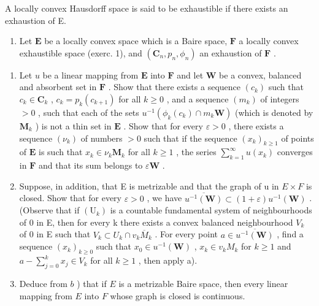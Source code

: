 A locally convex Hausdorff space is said to be exhaustible if there exists an exhaustion of E.

\begin{enumerate}
\def\labelenumi{\arabic{enumi})}
\setcounter{enumi}{1}
\tightlist
\item
  Let \(\mathbf{E}\) be a locally convex space which is a Baire space, \(\mathbf{F}\) a locally convex exhaustible space (exerc. 1), and \((\mathbf{C}_n, p_n, \phi_n)\) an exhaustion of \(\mathbf{F}\) .
\end{enumerate}

\begin{enumerate}
\def\labelenumi{\alph{enumi})}
\item
  Let \(u\) be a linear mapping from \(\mathbf{E}\) into \(\mathbf{F}\) and let \(\mathbf{W}\) be a convex, balanced and absorbent set in \(\mathbf{F}\) . Show that there exists a sequence \((c_k)\) such that \(c_k \in \mathbf{C}_k\) , \(c_k = p_k(c_{k+1})\) for all \(k \geqslant 0\) , and a sequence \((m_k)\) of integers \(> 0\) , such that each of the sets \(u^{-1}(\phi_k(c_k) \cap m_k\mathbf{W})\) (which is denoted by \(\mathbf{M}_k\) ) is not a thin set in \(\mathbf{E}\) . Show that for every \(\varepsilon > 0\) , there exists a sequence \((\nu_k)\) of numbers \(> 0\) such that if the sequence \((x_k)_{k \geqslant 1}\) of points of \(\mathbf{E}\) is such that \(x_k \in \nu_k\mathbf{M}_k\) for all \(k \geqslant 1\) , the series \(\sum_{k=1}^{\infty} u(x_k)\) converges in \(\mathbf{F}\) and that its sum belongs to \(\varepsilon\mathbf{W}\) .
\item
  Suppose, in addition, that E is metrizable and that the graph of u in \(E \times F\) is closed. Show that for every \(\varepsilon > 0\) , we have \(\overline{u^{-1}(\mathbf{W})} \subset (1 + \varepsilon) u^{-1}(\mathbf{W})\) . (Observe that if \((\mathrm{U}_{k})\) is a countable fundamental system of neighbourhoods of 0 in E, then for every k there exists a convex balanced neighbourhood \(V_{k}\) of 0 in E such that \(V_{k} \subset U_{k} \cap v_{k} \overline{M}_{k}\) . For every point \(a \in \overline{u^{-1}(\mathbf{W})}\) , find a sequence \((x_{k})_{k \geqslant 0}\) such that \(x_{0} \in u^{-1}(\mathbf{W})\) , \(x_{k} \in v_{k} M_{k}\) for \(k \geqslant 1\) and \(a - \sum_{j=0}^{k} x_{j} \in V_{k}\) for all \(k \geqslant 1\) , then apply a).
\item
  Deduce from \(b\) ) that if \(E\) is a metrizable Baire space, then every linear mapping from \(E\) into \(F\) whose graph is closed is continuous.
\end{enumerate}

